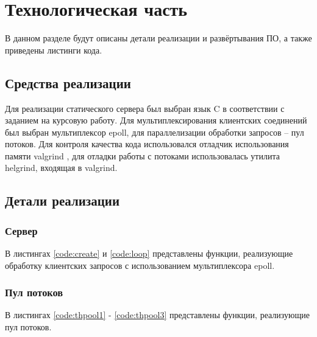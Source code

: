 \section{Технологическая часть}
В данном разделе будут описаны детали реализации и развёртывания ПО, а также приведены листинги кода.
\subsection{Средства реализации}
Для реализации статического сервера был выбран язык C в соответствии
с заданием на курсовую работу. Для мультиплексирования клиентских соединений был выбран мультиплексор epoll, для параллелизации обработки запросов -- пул потоков.
Для контроля качества кода использовался отладчик использования памяти valgrind \cite{valgrind}, для отладки работы с потоками использовалась утилита helgrind\cite{helgrind}, входящая в valgrind.


\subsection{Детали реализации}
\subsubsection{Сервер}
В листингах \ref{code:create} и \ref{code:loop} представлены функции, реализующие обработку клиентских запросов с использованием мультиплексора epoll.


\newpage


\subsubsection{Пул потоков}
В листингах \ref{code:thpool1} - \ref{code:thpool3} представлены функции, реализующие пул потоков.

